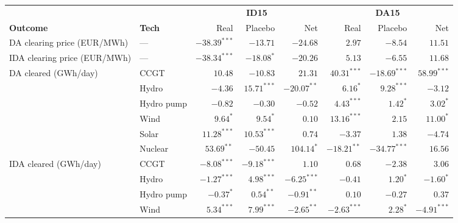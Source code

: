 \documentclass[11pt]{article}
\begin{document}
\begin{center}
\footnotesize
\setlength{\tabcolsep}{4pt}
\begin{tabular}{l l r r r r r r}
\toprule
                & & \multicolumn{3}{c}{\textbf{ID15}} & \multicolumn{3}{c}{\textbf{DA15}} \\
\cmidrule(lr){3-5} \cmidrule(lr){6-8}
\textbf{Outcome} & \textbf{Tech} & Real & Placebo & Net & Real & Placebo & Net \\
\midrule
DA clearing price (EUR/MWh)  & ---        & $-38.39^{***}$ & $-13.71$       & $-24.68$         & $2.97$         & $-8.54$         & $11.51$ \\
IDA clearing price (EUR/MWh) & ---        & $-38.34^{***}$ & $-18.08^{*}$   & $-20.26$         & $5.13$         & $-6.55$         & $11.68$ \\
\addlinespace
DA cleared (GWh/day)         & CCGT       & $10.48$        & $-10.83$       & $21.31$          & $40.31^{***}$  & $-18.69^{***}$  & $58.99^{***}$ \\
                             & Hydro      & $-4.36$        & $15.71^{***}$  & $-20.07^{**}$    & $6.16^{*}$     & $9.28^{***}$    & $-3.12$ \\
                             & Hydro pump & $-0.82$        & $-0.30$        & $-0.52$          & $4.43^{***}$   & $1.42^{*}$      & $3.02^{*}$ \\
                             & Wind       & $9.64^{*}$     & $9.54^{*}$     & $0.10$           & $13.16^{***}$  & $2.15$          & $11.00^{*}$ \\
                             & Solar      & $11.28^{***}$  & $10.53^{***}$  & $0.74$           & $-3.37$        & $1.38$          & $-4.74$ \\
                             & Nuclear    & $53.69^{**}$   & $-50.45$       & $104.14^{*}$     & $-18.21^{**}$  & $-34.77^{***}$  & $16.56$ \\
\addlinespace
IDA cleared (GWh/day)        & CCGT       & $-8.08^{***}$  & $-9.18^{***}$  & $1.10$           & $0.68$         & $-2.38$         & $3.06$ \\
                             & Hydro      & $-1.27^{***}$  & $4.98^{***}$   & $-6.25^{***}$    & $-0.41$        & $1.20^{*}$      & $-1.60^{*}$ \\
                             & Hydro pump & $-0.37^{*}$    & $0.54^{**}$    & $-0.91^{**}$     & $0.10$         & $-0.27$         & $0.37$ \\
                             & Wind       & $5.34^{***}$   & $7.99^{***}$   & $-2.65^{**}$     & $-2.63^{***}$  & $2.28^{*}$      & $-4.91^{***}$ \\

\end{tabular}
\end{center}
\end{document}
